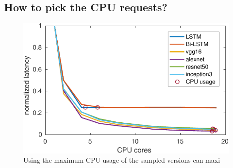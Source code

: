 \subsection{How to pick the CPU requests?}





%

\begin{figure}[h]
	\centering
	\includegraphics[width=0.7\linewidth]{figs/pick_cpu_cores}
	\caption{Using the maximum CPU usage of the sampled versions can maxi}
	\label{fig:pick_cpu_cores}
\end{figure}

